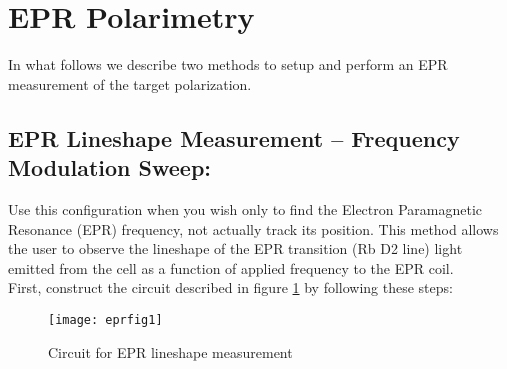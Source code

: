 \section{EPR Polarimetry}
\label{sec:epr}

  
In what follows we describe two methods to setup and perform an EPR
measurement of the target polarization.

\subsection{EPR Lineshape Measurement -- Frequency Modulation Sweep:} 
\label{sec:eprfms}

Use this configuration when you wish only to find the Electron
Paramagnetic Resonance (EPR) frequency,
not actually track its position.  This method allows the user to observe
the lineshape of the
EPR transition (Rb D2 line) light emitted from the cell as a function of applied
frequency to the EPR coil. \\

First, construct the  circuit described in figure \ref{fig1:epr} by
following these steps:

\begin{figure}
\begin{center}
\centerline{\texttt{[image: eprfig1]}}
\caption{Circuit for EPR lineshape measurement}
\end{center}
\label{fig1:epr}
\end{figure}

